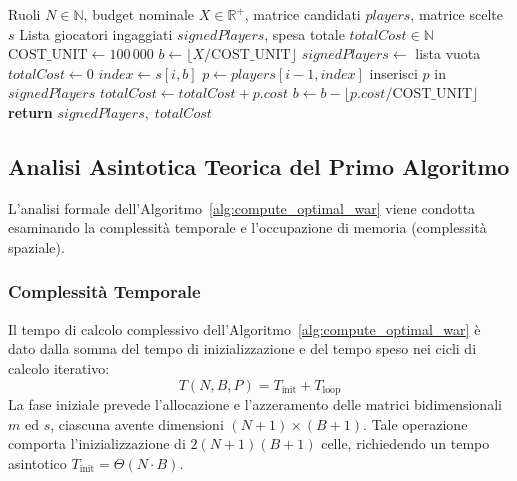 \begin{algorithm}[!htbp]
	\small
	\caption{Ricostruzione della Rosa Ottima mediante Backtracking}
	\label{alg:reconstruct_optimal_roster}
	\begin{algorithmic}[1]
		\Require Ruoli $N \in \mathbb{N}$, budget nominale $X \in \mathbb{R}^+$, matrice candidati $\mathit{players}$, matrice scelte $s$
		\Ensure Lista giocatori ingaggiati $\mathit{signedPlayers}$, spesa totale $\mathit{totalCost} \in \mathbb{N}$
		\State $\text{COST\_UNIT} \gets 100\,000$
		\State $b \gets \lfloor X / \text{COST\_UNIT} \rfloor$
		\State $\mathit{signedPlayers} \gets$ lista vuota
		\State $\mathit{totalCost} \gets 0$
		 
		\State $\mathit{index} \gets s[i, b]$
		 
		\State $p \gets \mathit{players}[i - 1, \mathit{index}]$
		\State inserisci $p$ in $\mathit{signedPlayers}$
		\State $\mathit{totalCost} \gets \mathit{totalCost} + p.\mathit{cost}$
		\State $b \gets b - \lfloor p.\mathit{cost} / \text{COST\_UNIT} \rfloor$ 
		\EndIf
		\EndFor
		\State \textbf{return} $\mathit{signedPlayers}, \; \mathit{totalCost}$
		\EndProcedure
	\end{algorithmic}
\end{algorithm}

\subsection{Analisi Asintotica Teorica del Primo Algoritmo}
L'analisi formale dell'Algoritmo~\ref{alg:compute_optimal_war} viene condotta esaminando la complessità temporale e l'occupazione di memoria (complessità spaziale).

\subsubsection{Complessità Temporale}
Il tempo di calcolo complessivo dell'Algoritmo~\ref{alg:compute_optimal_war} è dato dalla somma del tempo di inizializzazione e del tempo speso nei cicli di calcolo iterativo:
\begin{equation}
	T(N, B, P) = T_{\text{init}} + T_{\text{loop}}
\end{equation}
La fase iniziale prevede l'allocazione e l'azzeramento delle matrici bidimensionali $m$ ed $s$, ciascuna avente dimensioni $(N + 1) \times (B + 1)$. Tale operazione comporta l'inizializzazione di $2(N+1)(B+1)$ celle, richiedendo un tempo asintotico $T_{\text{init}} = \Theta(N \cdot B)$.

